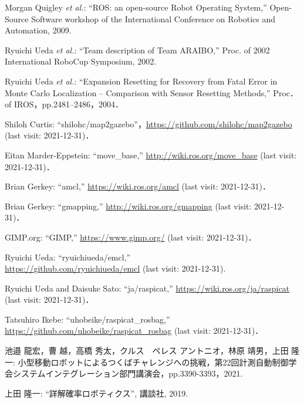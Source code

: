 \documentclass[twocolumn,9pt]{jsproceedings}
\begin{document}

\footnotesize
\begin{thebibliography}{99}
	  Morgan Quigley {\it et al.}: ``ROS: an open-source Robot Operating System,'' 
Open-Source Software workshop of the International Conference on Robotics and Automation, 2009. 

	Ryuichi Ueda {\it et al.}: 
``Team description of Team ARAIBO,'' 
Proc. of 2002 International RoboCup Symposium, 2002. 

	Ryuichi Ueda {\it et al.}: 
  ``Expansion Resetting for Recovery from Fatal Error in Monte Carlo Localization -- Comparison with Sensor Resetting Methods,'' Proc．of IROS，pp.2481--2486，2004．
  
  Shiloh Curtis: ``shilohc/map2gazebo''，\url{https://github.com/shilohc/map2gazebo} (last visit: 2021-12-31)．
  
  Eitan Marder-Eppstein: ``move\_base,'' \url{http://wiki.ros.org/move_base} (last visit: 2021-12-31)．
  
  Brian Gerkey: ``amcl,'' \url{https://wiki.ros.org/amcl} (last visit: 2021-12-31)．

  Brian Gerkey: ``gmapping,'' \url{http://wiki.ros.org/gmapping} (last visit: 2021-12-31)．
  
  GIMP.org: ``GIMP,'' \url{https://www.gimp.org/} (last visit: 2021-12-31)．
  
  Ryuichi Ueda: ``ryuichiueda/emcl,''\\\url{https://github.com/ryuichiueda/emcl} (last visit: 2021-12-31).
  
  Ryuichi Ueda and Daisuke Sato: ``ja/raspicat,'' \url{https://wiki.ros.org/ja/raspicat} (last visit: 2021-12-31)．
  
  Tatsuhiro Ikebe: ``uhobeike/raspicat\_rosbag,'' \url{https://github.com/uhobeike/raspicat_rosbag} (last visit: 2021-12-31)．


 池邉 龍宏，曹 越，高橋 秀太，クルス　ペレス アントニオ，林原 靖男，上田 隆一: 小型移動ロボットによるつくばチャレンジへの挑戦，第22回計測自動制御学会システムインテグレーション部門講演会，pp.3390-3393，2021.

上田 隆一: ``詳解確率ロボティクス'', 講談社, 2019.


\end{thebibliography}
\end{document}
